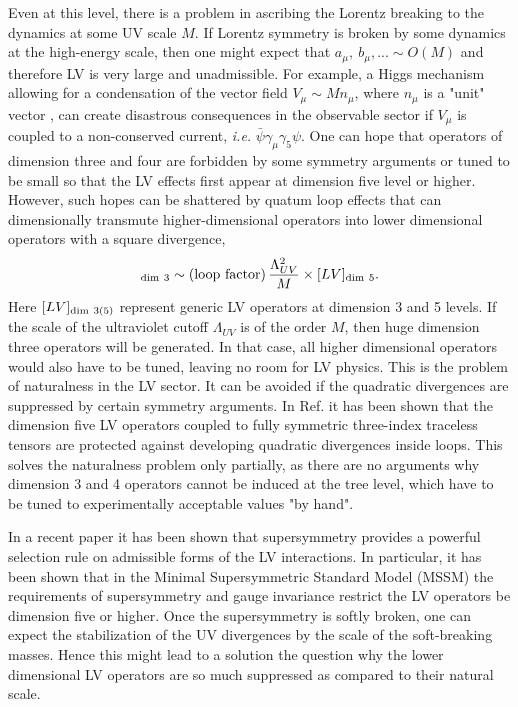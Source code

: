 \documentclass[12pt]{revtex4}
\begin{document}
Even at this level, there is a problem in ascribing the Lorentz breaking 
to the dynamics at some UV scale $M$. If Lorentz symmetry is broken by 
some dynamics at the high-energy scale, then one might expect that $a_\mu,~b_\mu,... \sim O(M)$
and therefore LV is very large and unadmissible. For example, a Higgs mechanism 
allowing for a condensation of the vector field $V_{\mu}\sim M n_\mu$, where $n_\mu$ is a 
"unit" vector \cite{Kostelecky:1989jw}, can create disastrous consequences in the observable sector if 
$V_\mu$ is coupled to a non-conserved current, {\em i.e.} $\bar \psi \gamma_\mu\gamma_5 \psi$.  
One can hope that operators of dimension three and four are forbidden by 
some symmetry arguments or tuned to be small so that the LV effects 
first appear at dimension five level \cite{MP:} 
or higher. However, such hopes can be shattered by quatum loop effects that 
can dimensionally transmute higher-dimensional operators into lower dimensional operators
with a square divergence,
\begin{equation}
[LV]_{\rm dim~3} \sim ({\rm loop~factor}) \, 
\frac{\Lambda_{UV}^2}{M} 
\times [LV]_{{\rm dim}~5}. 
\label{transmute}
\end{equation}
Here $[LV]_{\rm dim~3(5)}$ represent generic LV operators at dimension
3 and 5 levels. If the scale of the ultraviolet cutoff $\Lambda_{UV}$
is of the order $M$, then huge dimension three operators will be
generated. In that case, all higher dimensional operators would also 
have to be tuned, leaving no room for LV physics. This is the problem
of naturalness in the LV sector. It can be avoided if the quadratic
divergences are suppressed by certain symmetry arguments. In
Ref. \cite{MP:} it has been shown that the dimension five LV operators
coupled to fully symmetric three-index traceless tensors are protected
against developing quadratic divergences inside loops. This solves the
naturalness problem only partially, as there are no arguments why
dimension 3 and 4 operators cannot be induced at the tree level, which
have to be tuned to experimentally acceptable values  "by hand".  

In a recent paper \cite{GrootNibbelink:2004za} it has been shown that
supersymmetry provides a powerful selection  rule on admissible forms
of the LV interactions. In particular, it has been shown that  in the
Minimal Supersymmetric Standard Model (MSSM) the requirements of
supersymmetry and gauge invariance restrict the LV operators be
dimension five or higher. Once the supersymmetry is softly broken, one
can expect the stabilization of the UV divergences by the scale of the
soft-breaking masses. Hence this might lead to a solution the question
why the lower dimensional LV operators are so much suppressed as
compared to their natural scale. 
\end{document}

